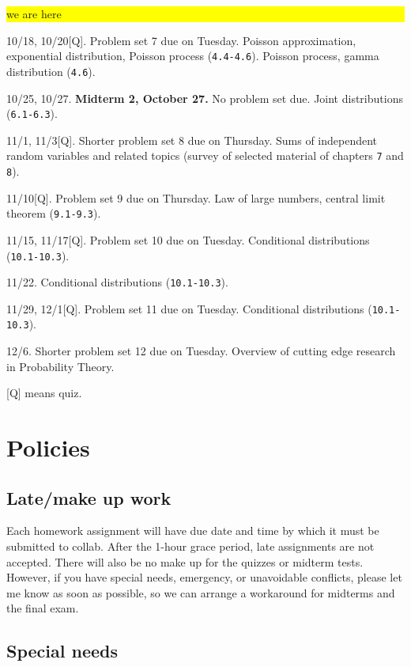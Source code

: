 \documentclass[oneside,11pt]{amsart}
\begin{document}
\begin{enumerate}[\bf{}{[}week 1{]}]
		\colorbox{yellow}{\parbox{.7\textwidth}{we are here}}
	\item 10/18, 10/20[Q]. 
		Problem set 7 due on Tuesday.
		Poisson approximation, exponential distribution, Poisson process
		(\texttt{4.4-4.6}).
		Poisson process, gamma distribution (\texttt{4.6}). 
	\item 10/25, 10/27. \textbf{Midterm 2, October 27.}
		No problem set due.		
		Joint distributions (\texttt{6.1-6.3}).
	\item 11/1, 11/3[Q].
		Shorter problem set 8 due on Thursday.
		Sums of independent random variables and related topics (survey of 
		selected material of chapters \texttt{7} and \texttt{8}).
	\item 11/10[Q].
		Problem set 9 due on Thursday.
		Law of large numbers, central limit theorem (\texttt{9.1-9.3}).
	\item 11/15, 11/17[Q].
		Problem set 10 due on Tuesday.
		Conditional distributions (\texttt{10.1-10.3}).
	\item 11/22.
		Conditional distributions (\texttt{10.1-10.3}).
	\item 11/29, 12/1[Q].
		Problem set 11 due on Tuesday.
		Conditional distributions (\texttt{10.1-10.3}).
	\item 12/6.
		Shorter problem set 12 due on Tuesday.
		Overview of cutting edge research in Probability Theory.
\end{enumerate}

[Q] means quiz.

\section{Policies}

\subsection{Late/make up work} Each homework
assignment will have due date and time by which it must be submitted to collab.
After the 1-hour grace period, late assignments are not accepted.
There will also be no make up for the quizzes or midterm tests.
However, if you have special needs, emergency, or unavoidable conflicts, please
let me know as soon as possible, so we can arrange a workaround for midterms and the final exam.

\subsection{Special needs}
\end{document}
